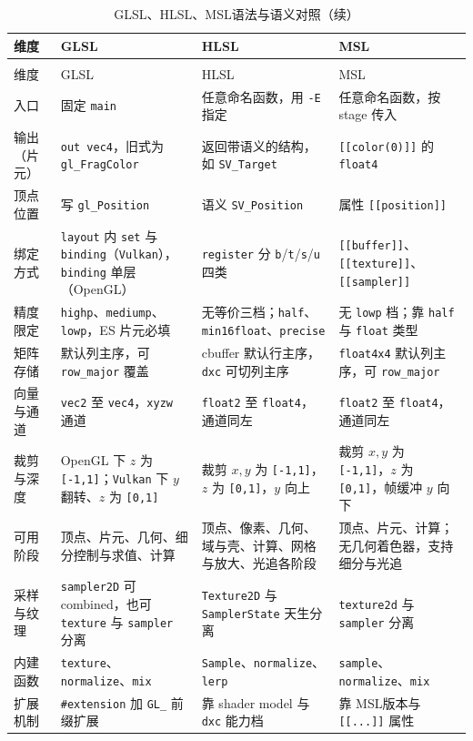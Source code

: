 \documentclass[12pt,a4paper,fontset=fandol]{ctexbook}
\newcommand{\Tp}[1]{\texttt{#1}}
\newcommand{\Bk}{\discretionary{}{}{}}
\newcommand{\Lang}[1]{\textsf{#1}}
\newcommand{\GSL}{\Lang{GLSL}}
\newcommand{\HSL}{\Lang{HLSL}}
\newcommand{\MSL}{\Lang{MSL}}
\begin{document}
\begin{longtable}{>{\raggedright\arraybackslash}p{}
                  >{\raggedright\arraybackslash}p{}
                  >{\raggedright\arraybackslash}p{}
                  >{\raggedright\arraybackslash}p{}}
\caption{\GSL、\HSL、\MSL 语法与语义对照}\label{tab:apB-lang} \\
\toprule
维度 & \GSL & \HSL & \MSL \\
\midrule
\endfirsthead
\caption[]{\GSL、\HSL、\MSL 语法与语义对照（续）}\\
\toprule
维度 & \GSL & \HSL & \MSL \\
\midrule
\endhead
\bottomrule
\endfoot
入口 & 固定 \Tp{main} & 任意命名函数，用 \Tp{-E} 指定 & 任意命名函数，按 stage 传入 \\
输出（片元） & \Tp{out vec4}，旧式为 \Tp{gl\_FragColor} & 返回带语义的结构，如 \Tp{SV\_Target} & \Tp{[[color(0)]]} 的 \Tp{float4} \\
顶点位置 & 写 \Tp{gl\_Position} & 语义 \Tp{SV\_Position} & 属性 \Tp{[[position]]} \\
绑定方式 & \Tp{layout} 内 \Tp{set} 与 \Tp{binding}（\Tp{Vulkan}），\Tp{binding} 单层（OpenGL） & \Tp{register} 分 \Tp{b}/{\Bk}\Tp{t}/{\Bk}\Tp{s}/{\Bk}\Tp{u} 四类 & \Tp{[[buffer]]}、\Tp{[[texture]]}、\Tp{[[sampler]]} \\
精度限定 & \Tp{highp}、\Tp{mediump}、\Tp{lowp}，ES 片元必填 & 无等价三档；\Tp{half}、\Tp{min16float}、\Tp{precise} & 无 \Tp{lowp} 档；靠 \Tp{half} 与 \Tp{float} 类型 \\
矩阵存储 & 默认列主序，可 \Tp{row\_major} 覆盖 & cbuffer 默认行主序，\Tp{dxc} 可切列主序 & \Tp{float4x4} 默认列主序，可 \Tp{row\_major} \\
向量与通道 & \Tp{vec2} 至 \Tp{vec4}，\Tp{xyzw} 通道 & \Tp{float2} 至 \Tp{float4}，通道同左 & \Tp{float2} 至 \Tp{float4}，通道同左 \\
裁剪与深度 & OpenGL 下 $z$ 为 \Tp{[-1,1]}；\Tp{Vulkan} 下 $y$ 翻转、$z$ 为 \Tp{[0,1]} & 裁剪 $x,y$ 为 \Tp{[-1,1]}，$z$ 为 \Tp{[0,1]}，$y$ 向上 & 裁剪 $x,y$ 为 \Tp{[-1,1]}，$z$ 为 \Tp{[0,1]}，帧缓冲 $y$ 向下 \\
可用阶段 & 顶点、片元、几何、细分控制与求值、计算 & 顶点、像素、几何、域与壳、计算、网格与放大、光追各阶段 & 顶点、片元、计算；无几何着色器，支持细分与光追 \\
采样与纹理 & \Tp{sampler2D} 可 combined，也可 \Tp{texture} 与 \Tp{sampler} 分离 & \Tp{Texture2D} 与 \Tp{SamplerState} 天生分离 & \Tp{texture2d} 与 \Tp{sampler} 分离 \\
内建函数 & \Tp{texture}、\Tp{normalize}、\Tp{mix} & \Tp{Sample}、\Tp{normalize}、\Tp{lerp} & \Tp{sample}、\Tp{normalize}、\Tp{mix} \\
扩展机制 & \Tp{\#extension} 加 \Tp{GL\_} 前缀扩展 & 靠 shader model 与 \Tp{dxc} 能力档 & 靠 \MSL 版本与 \Tp{[[...]]} 属性 \\
\end{longtable}
\end{document}
